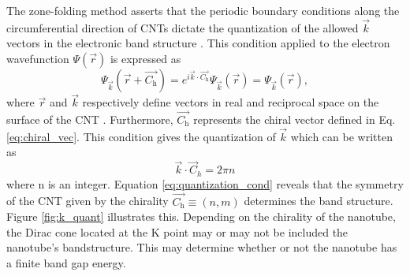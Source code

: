 The zone-folding method asserts that the periodic boundary conditions along the circumferential direction of CNTs dictate the quantization of the allowed $\vec{k}$ vectors in the electronic band structure \cite{charlier2007electronic}. This condition applied to the electron wavefunction $\Psi(\vec{r})$ is expressed as
\begin{equation}
\Psi_{\vec{k}}(\vec{r} + \vec{C_\text{h}}) = e^{i \vec{k} \cdot \vec{C_\text{h}}} \Psi_{\vec{k}}(\vec{r}) = \Psi_{\vec{k}}(\vec{r}),
\label{eq:boundary_cond}
\end{equation}
where $\vec{r}$ and $\vec{k}$ respectively define vectors in real and reciprocal space on the surface of the CNT \cite{charlier2007electronic}. Furthermore, $\vec{C_\text{h}}$ represents the chiral vector defined in Eq. \ref{eq:chiral_vec}. This condition gives the quantization of $\vec{k}$ which can be written as
\begin{equation}
	\vec{k} \cdot \vec{C}_h = 2\pi n
	\label{eq:quantization_cond}
\end{equation}
where n is an integer. Equation \ref{eq:quantization_cond} reveals that the symmetry of the CNT given by the chirality $\vec{C_\text{h}} \equiv (n,m)$ determines the band structure. Figure \ref{fig:k_quant} illustrates this. Depending on the chirality of the nanotube, the Dirac cone located at the K point may or may not be included the nanotube's bandstructure. This may determine whether or not the nanotube has a finite band gap energy.



